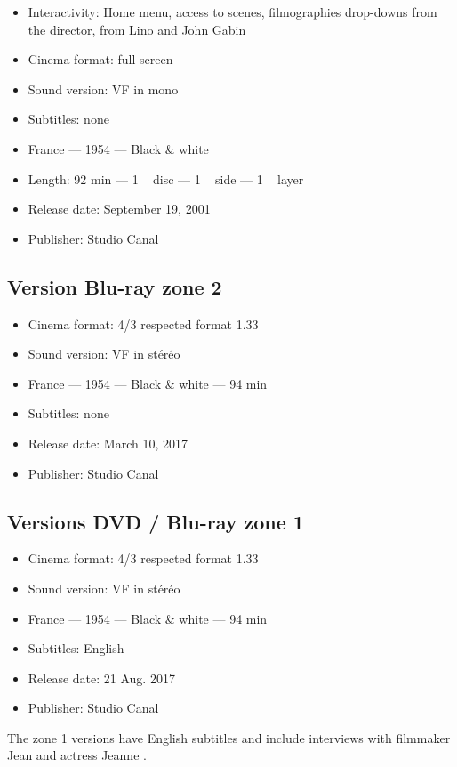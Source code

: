 \begin{itemize}
    \item Interactivity: Home menu, access to scenes, filmographies drop-downs from the director, from Lino  and John \familyname Gabin{}
    \item Cinema format: full screen
    \item Sound version: VF in mono
    \item Subtitles: none
    \item France --- 1954 --- Black \& white
    \item Length: 92 min --- 1 ~ disc --- 1 ~ side --- 1 ~ layer
    \item Release date: September 19, 2001
    \item Publisher: Studio Canal
\end{itemize}

\subsection*{Version Blu-ray zone 2}

\begin{itemize}
	\item Cinema format: 4/3 respected format 1.33
	\item Sound version: VF in stéréo
	\item France --- 1954 --- Black \& white --- 94 min
	\item Subtitles: none
	\item Release date: March 10, 2017
	\item Publisher: Studio Canal
\end{itemize}

\subsection*{Versions DVD / Blu-ray zone 1}

\begin{itemize}
	\item Cinema format: 4/3 respected format 1.33
	\item Sound version: VF in stéréo
	\item France --- 1954 --- Black \& white --- 94 min
	\item Subtitles: English
	\item Release date: 21 Aug. 2017
	\item Publisher: Studio Canal
\end{itemize}

The zone 1 versions have English subtitles and include interviews with filmmaker Jean  and actress Jeanne .

